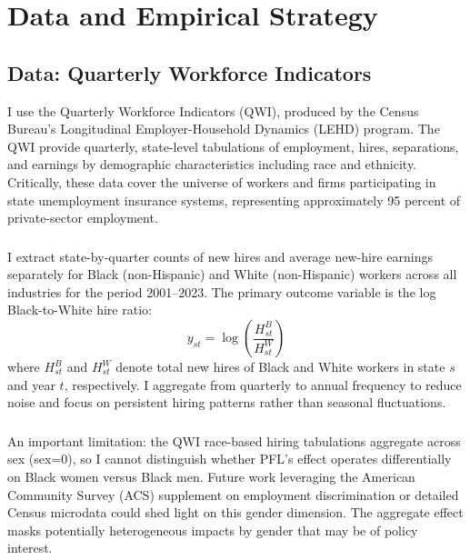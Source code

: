 \documentclass[12pt]{article}
\begin{document}
\section{Data and Empirical Strategy}

\subsection{Data: Quarterly Workforce Indicators}

I use the Quarterly Workforce Indicators (QWI), produced by the Census Bureau's Longitudinal Employer-Household Dynamics (LEHD) program. The QWI provide quarterly, state-level tabulations of employment, hires, separations, and earnings by demographic characteristics including race and ethnicity. Critically, these data cover the universe of workers and firms participating in state unemployment insurance systems, representing approximately 95 percent of private-sector employment.

\subsubsection*{}
I extract state-by-quarter counts of new hires and average new-hire earnings separately for Black (non-Hispanic) and White (non-Hispanic) workers across all industries for the period 2001--2023. The primary outcome variable is the log Black-to-White hire ratio:
\begin{equation}
    y_{st} = \log\left(\frac{H^{B}_{st}}{H^{W}_{st}}\right)
\end{equation}
where $H^{B}_{st}$ and $H^{W}_{st}$ denote total new hires of Black and White workers in state $s$ and year $t$, respectively. I aggregate from quarterly to annual frequency to reduce noise and focus on persistent hiring patterns rather than seasonal fluctuations.

\subsubsection*{}
An important limitation: the QWI race-based hiring tabulations aggregate across sex (sex=0), so I cannot distinguish whether PFL's effect operates differentially on Black women versus Black men. Future work leveraging the American Community Survey (ACS) supplement on employment discrimination or detailed Census microdata could shed light on this gender dimension. The aggregate effect masks potentially heterogeneous impacts by gender that may be of policy interest.
\end{document}
